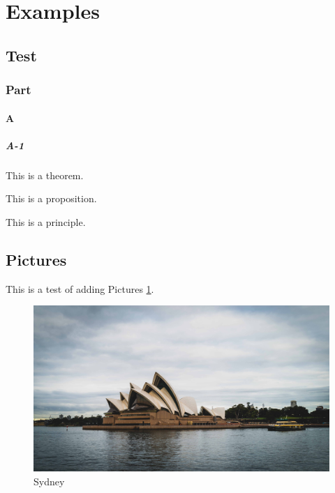 \documentclass{article}
\begin{document}
\tableofcontents
\newpage


\section{Examples}

\subsection{Test}

\subsubsection{Part}

\paragraph{A}

\subparagraph{A-1}

\begin{theorem}
    This is a theorem.
\end{theorem}

\begin{proposition}
    This is a proposition.
\end{proposition}

\begin{principle}
    This is a principle.
\end{principle}

\subsection{Pictures}

This is a test of adding Pictures \ref{fig.Sydney}.

\begin{figure}[htbp]
    \center
    \includegraphics[width=\linewidth]{fig/photo.jpg}
    \caption{Sydney}
	\label{fig.Sydney}
\end{figure}
\end{document}
